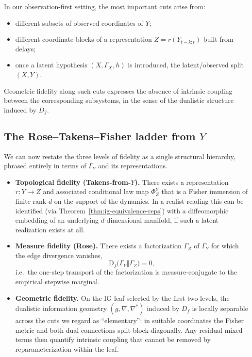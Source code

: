 \documentclass[11pt]{article}
\newcommand{\Df}{\mathrm{D}_f}
\newcommand{\1}{\mathbf{1}}
\begin{document}
In our observation-first setting, the most important cuts arise from:
\begin{itemize}[leftmargin=1.5em]
  \item different subsets of observed coordinates of $Y$;
  \item different coordinate blocks of a representation $Z=r(Y_{t-k:t})$ built from delays;
  \item once a latent hypothesis $(X,\Gamma_X,h)$ is introduced, the latent/observed split $(X,Y)$.
\end{itemize}
Geometric fidelity along such cuts expresses the absence of intrinsic coupling between the corresponding subsystems, in the sense of the dualistic structure induced by $D_f$.

\subsection{The Rose--Takens--Fisher ladder from $Y$}

We can now restate the three levels of fidelity as a single structural hierarchy, phrased entirely in terms of $\Gamma_Y$ and its representations.

\begin{itemize}[leftmargin=1.5em]
  \item \textbf{Topological fidelity (Takens-from-$Y$).}
        There exists a representation $r:Y\to Z$ and associated conditional law map
        $\Phi_Z^Y$ that is a Fisher immersion of finite rank $d$ on the support of the dynamics.
        In a realist reading this can be identified (via Theorem~\ref{thm:ig-equivalence-reps}) with
        a diffeomorphic embedding of an underlying $d$-dimensional manifold, if such a latent
        realization exists at all.
  \item \textbf{Measure fidelity (Rose).}
        There exists a factorization $\Gamma_Z$ of $\Gamma_Y$ for which the
        edge divergence vanishes,
        \[
          \Df\big(\Gamma_Y\big\Vert\Gamma_Z\big) = 0,
        \]
        i.e.\ the one-step transport of the factorization is measure-conjugate to the empirical
        stepwise marginal.
  \item \textbf{Geometric fidelity.}
        On the IG leaf selected by the first two levels, the dualistic information geometry
        $(g,\nabla,\nabla^\ast)$ induced by $D_f$ is locally separable across the cuts we regard as
        ``elementary'': in suitable coordinates the Fisher metric and both dual connections split
        block-diagonally. Any residual mixed terms then quantify intrinsic coupling that cannot be
        removed by reparameterization within the leaf.
\end{itemize}
\end{document}
